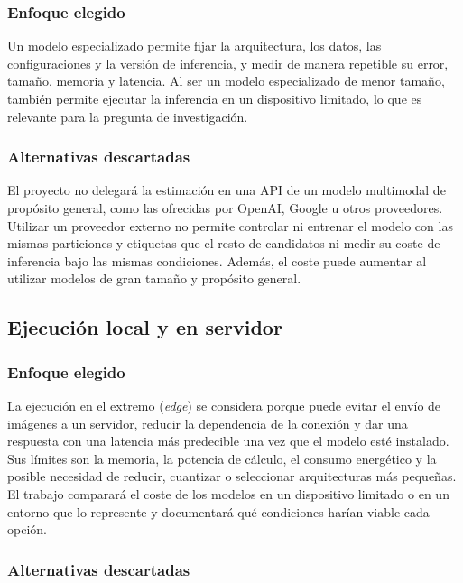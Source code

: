 \subsubsection{Enfoque elegido}

Un modelo especializado permite fijar la arquitectura, los datos, las
configuraciones y la versión de inferencia, y medir de manera repetible su
error, tamaño, memoria y latencia. Al ser un modelo especializado de menor tamaño,
también permite ejecutar la inferencia en un dispositivo limitado, lo que es relevante para
la pregunta de investigación.

\subsubsection{Alternativas descartadas}

El proyecto no delegará la estimación en una API de un modelo multimodal de
propósito general, como las ofrecidas por OpenAI, Google u otros proveedores.
Utilizar un proveedor externo no permite controlar ni entrenar el modelo con
las mismas particiones y etiquetas que el resto de candidatos ni medir su coste
de inferencia bajo las mismas condiciones. Además, el coste puede aumentar al
utilizar modelos de gran tamaño y propósito general.

\subsection{Ejecución local y en servidor}

\subsubsection{Enfoque elegido}

La ejecución en el extremo (\emph{edge}) se considera porque puede evitar el
envío de imágenes a un servidor, reducir la dependencia de la conexión y dar
una respuesta con una latencia más predecible una vez que el modelo esté instalado.
Sus límites son la memoria, la potencia de cálculo, el consumo energético y la
posible necesidad de reducir, cuantizar o seleccionar arquitecturas más
pequeñas. El trabajo comparará el coste de los modelos en un dispositivo
limitado o en un entorno que lo represente y documentará qué condiciones
harían viable cada opción.

\subsubsection{Alternativas descartadas}

